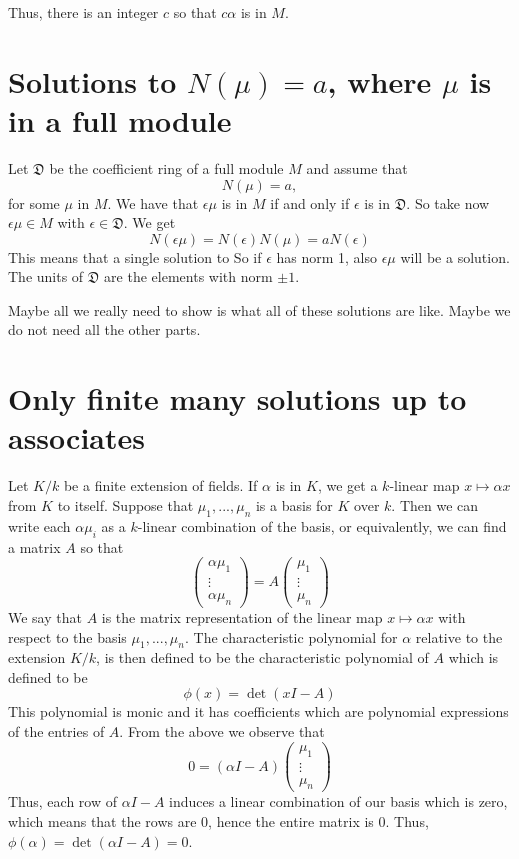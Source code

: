 \documentclass{article}
\newcommand{\mfrak}[1]{\mathfrak{#1}}
\begin{document}
Thus, there is an integer $c$ so that $c \alpha$ is in $M$. 




\section*{Solutions to $N(\mu) = a$, where $\mu$ is in a full module}


Let $\mfrak{D}$ be the coefficient ring of a full module $M$ and assume that 
$$N(\mu) = a,$$
for some $\mu$ in $M$. We have that $\epsilon \mu$ is in $M$ if and only if  $\epsilon$ is in $\mfrak{D}$. So take now $\epsilon \mu \in M$ with $\epsilon \in \mfrak{D}$. We get
$$N(\epsilon \mu) = N(\epsilon)N(\mu) = a N(\epsilon)$$
This means that a single solution to 
So if $\epsilon$ has norm 1, also $\epsilon \mu$ will be a solution. The units of $\mfrak{D}$ are the elements with norm $\pm 1$. 

Maybe all we really need to show is what all of these solutions are like. Maybe we do not need all the other parts. 




\section*{Only finite many solutions up to associates}
Let $K / k$ be a finite extension of fields. If $\alpha$ is in $K$, we get a $k$-linear map $x \mapsto \alpha x$ from $K$ to itself. Suppose that $\mu_1, ..., \mu_n$ is a basis for $K$ over $k$. Then we can write each $\alpha \mu_i$ as a $k$-linear combination of the basis, or equivalently, we can find a matrix $A$ so that 
$$\begin{pmatrix} \alpha \mu_1 \\ \vdots \\ \alpha \mu_n \end{pmatrix} = A \begin{pmatrix} \mu_1 \\ \vdots \\ \mu_n \end{pmatrix}$$
We say that $A$ is the matrix representation of the linear map $x \mapsto \alpha x$ with respect to the basis $\mu_1, ..., \mu_n$. The characteristic polynomial for $\alpha$ relative to the extension $K / k$, is then defined to be the characteristic polynomial of $A$ which is defined to be
$$\phi(x) = \det(xI - A)$$
This polynomial is monic and it has coefficients which are polynomial expressions of the entries of $A$. From the above we observe that
$$0 = (\alpha I - A) \begin{pmatrix} \mu_1 \\ \vdots \\ \mu_n \end{pmatrix}$$
Thus, each row of $\alpha I - A$ induces a linear combination of our basis which is zero, which means that the rows are 0, hence the entire matrix is 0. Thus, $\phi(\alpha) = \det(\alpha I - A) = 0$. 
\end{document}
